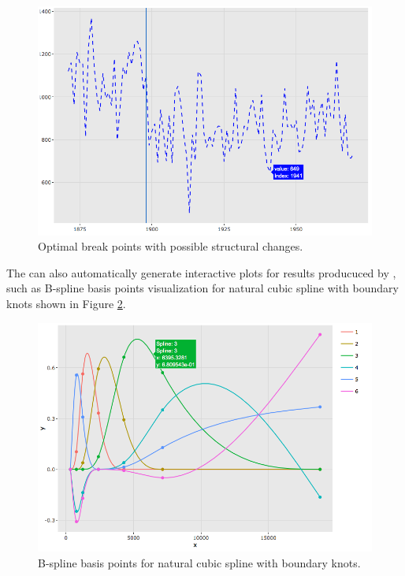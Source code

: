 \begin{figure}[htbp]
  \centering
  \includegraphics[width=145mm,scale=0.8]{images/strucchange_caption.png}
  \caption{Optimal break points with possible structural changes.}
  \label{figure:strucchange_caption}
\end{figure}


The  can also automatically generate interactive plots for results producuced by , such as B-spline basis points visualization for natural cubic spline with boundary knots shown in Figure \ref{figure:splines_caption}.

\begin{Schunk}
\end{Schunk}

\begin{figure}[htbp]
  \centering
  \includegraphics[width=145mm,scale=0.8]{images/splines_caption.png}
  \caption{B-spline basis points for natural cubic spline with boundary knots.}
  \label{figure:splines_caption}
\end{figure}

